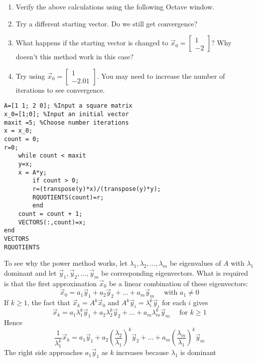\documentclass{ximera}
\begin{document}
\begin{exploration}
\begin{enumerate}
    \item\label{exp:2x2PowerMethod_a} Verify the above calculations using the following Octave window.
    \item\label{exp:2x2PowerMethod_b} Try a different starting vector.  Do we still get convergence?
    \item\label{exp:2x2PowerMethod_c} What happens if the starting vector is changed to $\vec{x}_{0} = \left[ \begin{array}{rr}
  1 \\
  -2
  \end{array}\right]$?  Why doesn't this method work in this case?
  \item\label{exp:2x2PowerMethod_d} Try using $\vec{x}_{0} = \left[ \begin{array}{rr}
  1 \\
  -2.01
  \end{array}\right]$.  You may need to increase the number of iterations to see convergence.
\end{enumerate}



\begin{verbatim}
A=[1 1; 2 0]; %Input a square matrix
x_0=[1;0]; %Input an initial vector
maxit =5; %Choose number iterations
x = x_0;
count = 0;
r=0;
    while count < maxit
    y=x;
    x = A*y;
        if count > 0; 
        r=(transpose(y)*x)/(transpose(y)*y);
        RQUOTIENTS(count)=r;
        end
    count = count + 1;
    VECTORS(:,count)=x;
end
VECTORS
RQUOTIENTS
\end{verbatim}

\end{exploration}


To see why the power method works, let $\lambda_{1}, \lambda_{2}, \dots, \lambda_{m}$ be eigenvalues of $A$ with $\lambda_{1}$ dominant and let $\vec{y}_{1}, \vec{y}_{2}, \dots, \vec{y}_{m}$ be corresponding eigenvectors. What is required is that the first approximation $\vec{x}_{0}$ be a linear combination of these eigenvectors:
\begin{equation*}
\vec{x}_{0} = a_{1}\vec{y}_{1} + a_{2}\vec{y}_{2} + \dots + a_{m}\vec{y}_{m} \quad \mbox{ with } a_{1} \neq 0
\end{equation*}
If $k \geq 1$, the fact that $\vec{x}_{k} = A^{k}\vec{x}_{0}$ and $A^k\vec{y}_{i} = \lambda_{i}^k\vec{y}_{i}$ for each $i$ gives
\begin{equation*}
\vec{x}_{k} = a_{1}\lambda_{1}^k\vec{y}_{1} + a_{2}\lambda_{2}^k\vec{y}_{2} + \dots + a_{m}\lambda_{m}^k\vec{y}_{m} \quad \mbox{ for } k \geq 1
\end{equation*}
Hence
\begin{equation*}
\frac{1}{\lambda_{1}^k}\vec{x}_{k} = a_{1}\vec{y}_{1} + a_{2}\left(\frac{\lambda_{2}}{\lambda_{1}}\right)^k\vec{y}_{2} + \dots + a_{m}\left(\frac{\lambda_{m}}{\lambda_{1}}\right)^k\vec{y}_{m}
\end{equation*}
The right side approaches $a_{1}\vec{y}_{1}$ as $k$ increases because $\lambda_{1}$ is dominant 
\end{document}
